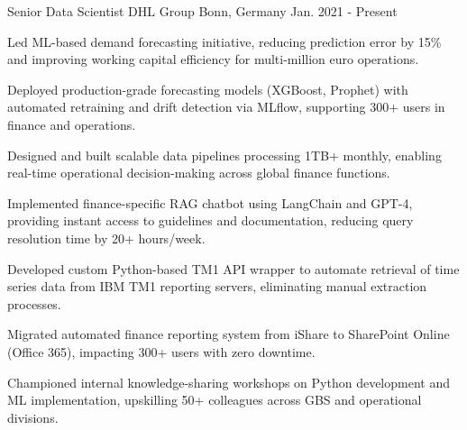 

\begin{cventries}
\cventry
  {Senior Data Scientist} %
  {DHL Group} %
  {Bonn, Germany} %
  {Jan. 2021 - Present} %
  {
    \begin{cvitems} %
      \item {Led ML-based demand forecasting initiative, reducing prediction error by 15\% and improving working capital efficiency for multi-million euro operations.}
      \item {Deployed production-grade forecasting models (XGBoost, Prophet) with automated retraining and drift detection via MLflow, supporting 300+ users in finance and operations.}
      \item {Designed and built scalable data pipelines processing 1TB+ monthly, enabling real-time operational decision-making across global finance functions.}
      \item {Implemented finance-specific RAG chatbot using LangChain and GPT-4, providing instant access to guidelines and documentation, reducing query resolution time by 20+ hours/week.}
      \item {Developed custom Python-based TM1 API wrapper to automate retrieval of time series data from IBM TM1 reporting servers, eliminating manual extraction processes.}
      \item {Migrated automated finance reporting system from iShare to SharePoint Online (Office 365), impacting 300+ users with zero downtime.}
      \item {Championed internal knowledge-sharing workshops on Python development and ML implementation, upskilling 50+ colleagues across GBS and operational divisions.}
    \end{cvitems} 
  }


\end{cventries}
